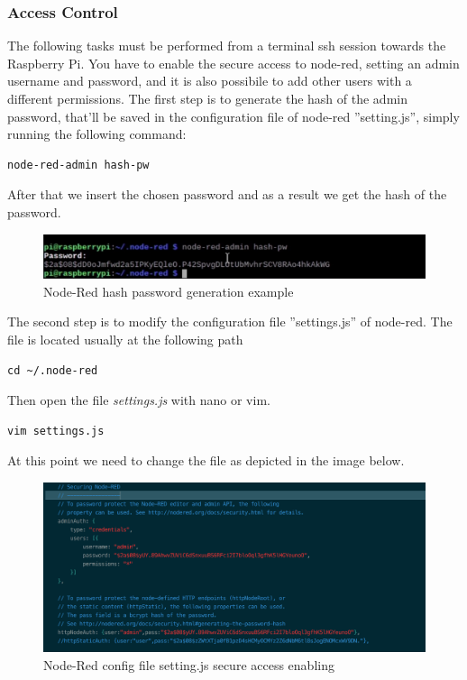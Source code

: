 \subsubsection{Access Control}
The following tasks must be performed from a terminal ssh session towards the Raspberry Pi.
\newline
You have to enable the secure access to node-red, setting an admin username and password, and it is also possibile to add other users with a different permissions.
\newline
\newline
The first step is to generate the hash of the admin password, that'll be saved in the configuration file of node-red ''setting.js'', simply running the following command:
\begin{verbatim}
node-red-admin hash-pw
\end{verbatim}
After that we insert the chosen password and as a result we get the hash of the password.

\begin{figure}[H]
	\begin{center}
		\includegraphics[width=1.0\textwidth]{./pictures/node-red_hash_password}
		\caption{Node-Red hash password generation example}
		\label{mqtt_functioning}
	\end{center}
\end{figure}

\noindent
The second step is to modify the configuration file ''settings.js'' of node-red.
\newline
The file is located usually at the following path
\begin{verbatim}
cd ~/.node-red
\end{verbatim}
Then open the file \emph{settings.js} with nano or vim.
\begin{verbatim}
vim settings.js
\end{verbatim}
At this point we need to change the file as depicted in the image below.

\begin{figure}[H]
	\begin{center}
		\includegraphics[width=1.0\textwidth]{./pictures/node-red-secure}
		\caption{Node-Red config file setting.js secure access enabling}
		\label{mqtt_functioning}
	\end{center}
\end{figure}

